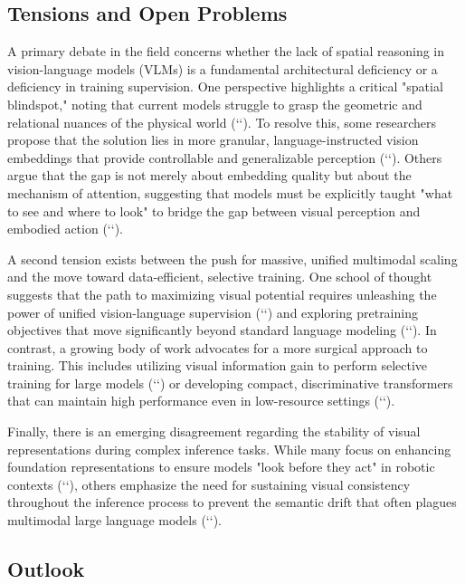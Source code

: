 \documentclass[11pt]{article}
\begin{document}
\subsection{Tensions and Open Problems}

A primary debate in the field concerns whether the lack of spatial reasoning in vision-language models (VLMs) is a fundamental architectural deficiency or a deficiency in training supervision. One perspective highlights a critical "spatial blindspot," noting that current models struggle to grasp the geometric and relational nuances of the physical world (`\citep{2601.09954}`). To resolve this, some researchers propose that the solution lies in more granular, language-instructed vision embeddings that provide controllable and generalizable perception (`\citep{2606.19584}`). Others argue that the gap is not merely about embedding quality but about the mechanism of attention, suggesting that models must be explicitly taught "what to see and where to look" to bridge the gap between visual perception and embodied action (`\citep{2607.01658}`).

A second tension exists between the push for massive, unified multimodal scaling and the move toward data-efficient, selective training. One school of thought suggests that the path to maximizing visual potential requires unleashing the power of unified vision-language supervision (`\citep{2601.19798}`) and exploring pretraining objectives that move significantly beyond standard language modeling (`\citep{2603.03276}`). In contrast, a growing body of work advocates for a more surgical approach to training. This includes utilizing visual information gain to perform selective training for large models (`\citep{2602.17186}`) or developing compact, discriminative transformers that can maintain high performance even in low-resource settings (`\citep{2604.18452}`).

Finally, there is an emerging disagreement regarding the stability of visual representations during complex inference tasks. While many focus on enhancing foundation representations to ensure models "look before they act" in robotic contexts (`\citep{2603.15618}`), others emphasize the need for sustaining visual consistency throughout the inference process to prevent the semantic drift that often plagues multimodal large language models (`\citep{2605.18160}`).

\subsection{Outlook}
\end{document}
